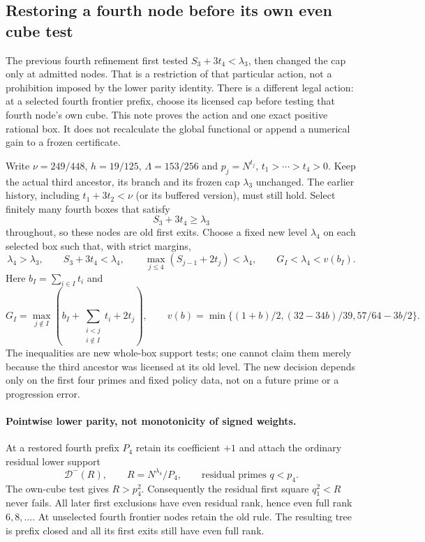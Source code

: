 \subsection{Restoring a fourth node before its own even cube test}
\label{sec:lower-fourth-own-cube-restoration}

The previous fourth refinement first tested
$S_3+3t_4<\lambda_3$, then changed the cap only at admitted nodes.
That is a restriction of that particular action, not a prohibition
imposed by the lower parity identity. There is a different legal
action: at a selected fourth frontier prefix, choose its licensed
cap before testing that fourth node's own cube. This note proves the
action and one exact positive rational box. It does not recalculate
the global functional or append a numerical gain to a frozen certificate.

Write $\nu=249/448$, $h=19/125$, $\Lambda=153/256$ and
$p_j=N^{t_j}$, $t_1>\cdots>t_4>0$. Keep the actual third ancestor,
its branch and its frozen cap $\lambda_3$ unchanged. The earlier
history, including $t_1+3t_2<\nu$ (or its buffered version), must
still hold. Select finitely many fourth boxes that satisfy
\[
 S_3+3t_4\ge\lambda_3
\]
throughout, so these nodes are old first exits. Choose a fixed new
level $\lambda_4$ on each selected box such that, with strict margins,
\begin{equation}\label{eq:own-cube-new-tests}
 \lambda_4>\lambda_3,\qquad S_3+3t_4<\lambda_4,
 \qquad \max_{j\le4}(S_{j-1}+2t_j)<\lambda_4,
 \qquad G_I<\lambda_4<v(b_I).
\end{equation}
Here $b_I=\sum_{i\in I}t_i$ and
\[
 G_I=\max_{j\notin I}\left(
 b_I+\sum_{\substack{i<j\\i\notin I}}t_i+2t_j\right),
 \qquad
 v(b)=\min\{(1+b)/2,(32-34b)/39,57/64-3b/2\}.
\]
The inequalities are new whole-box support tests; one cannot claim
them merely because the third ancestor was licensed at its old level.
The new decision depends only on the first four primes and fixed
policy data, not on a future prime or a progression error.

\paragraph{Pointwise lower parity, not monotonicity of signed weights.}
At a restored fourth prefix $P_4$ retain its coefficient $+1$ and
attach the ordinary residual lower support
\[
 \mathcal D^-(R),\qquad R=N^{\lambda_4}/P_4,
 \qquad \text{residual primes }q<p_4.
\]
The own-cube test gives $R>p_4^2$. Consequently the residual first
square $q_1^2<R$ never fails. All later first exclusions have even
residual rank, hence even full rank $6,8,\ldots$. At unselected
fourth frontier nodes retain the old rule. The resulting tree is
prefix closed and all its first exits still have even full rank.

